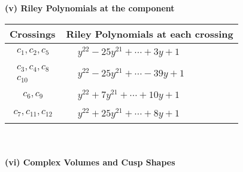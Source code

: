 \documentclass[1p]{elsarticle_modified}
\theoremstyle{definition}
\begin{document}
\newpage\renewcommand{\arraystretch}{1}
\flushleft \textbf{(v) Riley Polynomials at the component}\newline \\
\begin{tabular}{m{50pt}|m{274pt}}
Crossings & \hspace{64pt}Riley Polynomials at each crossing \\
\hline $$\begin{aligned}c_{1},c_{2},c_{5}\end{aligned}$$&$\begin{aligned}
&y^{22}-25 y^{21}+\cdots+3 y+1
\end{aligned}$\\
\hline $$\begin{aligned}c_{3},c_{4},c_{8}\\c_{10}\end{aligned}$$&$\begin{aligned}
&y^{22}-25 y^{21}+\cdots-39 y+1
\end{aligned}$\\
\hline $$\begin{aligned}c_{6},c_{9}\end{aligned}$$&$\begin{aligned}
&y^{22}+7 y^{21}+\cdots+10 y+1
\end{aligned}$\\
\hline $$\begin{aligned}c_{7},c_{11},c_{12}\end{aligned}$$&$\begin{aligned}
&y^{22}+25 y^{21}+\cdots+8 y+1
\end{aligned}$\\
\hline
\end{tabular}\\~\\
\newpage\flushleft \textbf{(vi) Complex Volumes and Cusp Shapes}
\end{document}
